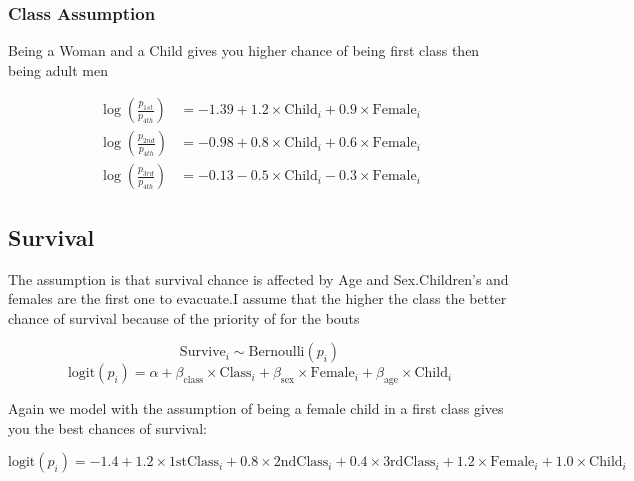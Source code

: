 \documentclass[12pt]{article}
\begin{document}
\subsubsection{Class Assumption}
Being a Woman and a Child gives you higher chance of being first class then being adult men 

\begin{align*}
	\log\left(\frac{p_{1st}}{p_{4th}}\right) &= -1.39 + 1.2 \times \text{Child}_i + 0.9 \times \text{Female}_i \\
	\log\left(\frac{p_{2nd}}{p_{4th}}\right) &= -0.98 + 0.8 \times \text{Child}_i + 0.6 \times \text{Female}_i \\
	\log\left(\frac{p_{3rd}}{p_{4th}}\right) &= -0.13 - 0.5 \times \text{Child}_i - 0.3 \times \text{Female}_i
\end{align*}

\subsection{Survival}
The assumption is that survival chance is affected by Age and Sex.Children's and females are the first one to evacuate.I assume that the higher the class the better chance of survival because of the priority of for the bouts 

$$\text{Survive}_i \sim \text{Bernoulli}(p_i)$$
$$\text{logit}(p_i) = \alpha + \beta_{\text{class}} \times \text{Class}_i + \beta_{\text{sex}} \times \text{Female}_i + \beta_{\text{age}} \times \text{Child}_i$$

Again we model with the assumption of being a female child in a first class gives you the best chances of survival:

$$\text{logit}(p_i) = -1.4 + 1.2 \times \text{1stClass}_i + 0.8 \times \text{2ndClass}_i + 0.4 \times \text{3rdClass}_i + 1.2 \times \text{Female}_i + 1.0 \times \text{Child}_i$$
\end{document}
